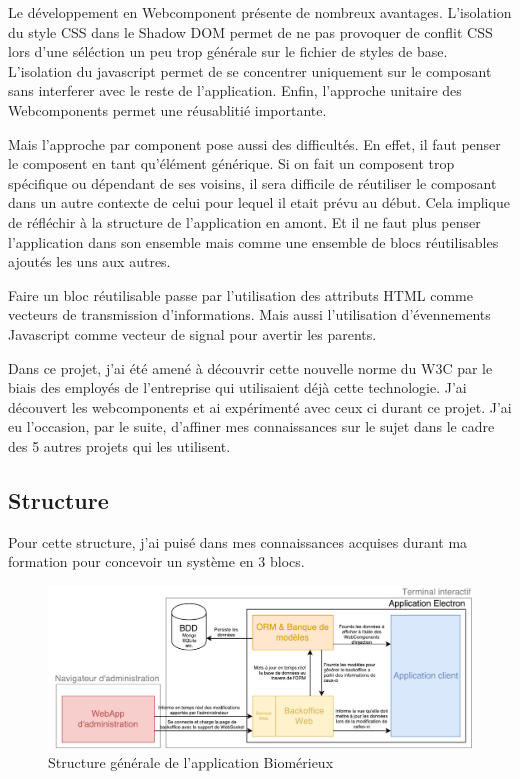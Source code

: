 \bigskip

Le développement en Webcomponent présente de nombreux avantages.
L'isolation du style CSS dans le Shadow DOM permet de ne pas provoquer de conflit CSS lors d'une séléction un peu trop générale sur le fichier de styles de base.
L'isolation du javascript permet de se concentrer uniquement sur le composant sans interferer avec le reste de l'application.
Enfin, l'approche unitaire des Webcomponents permet une réusablitié importante.

Mais l'approche par component pose aussi des difficultés.
En effet, il faut penser le composent en tant qu'élément générique.
Si on fait un composent trop spécifique ou dépendant de ses voisins, il sera difficile de réutiliser le composant dans un autre contexte de celui pour lequel il etait prévu au début.
Cela implique de réfléchir à la structure de l'application en amont.
Et il ne faut plus penser l'application dans son ensemble mais comme une ensemble de blocs réutilisables ajoutés les uns aux autres.

Faire un bloc réutilisable passe par l'utilisation des attributs HTML comme vecteurs de transmission d'informations.
Mais aussi l'utilisation d'évennements Javascript comme vecteur de signal pour avertir les parents.

\bigskip

Dans ce projet, j'ai été amené à découvrir cette nouvelle norme du W3C par le biais des employés de l'entreprise qui utilisaient déjà cette technologie.
J'ai découvert les webcomponents et ai expérimenté avec ceux ci durant ce projet.
J'ai eu l'occasion, par le suite, d'affiner mes connaissances sur le sujet dans le cadre des 5 autres projets qui les utilisent.

\subsection{Structure}

Pour cette structure, j'ai puisé dans mes connaissances acquises durant ma formation pour concevoir un système en 3 blocs.

\begin{figure}[h]
    \centering
    \includegraphics[scale=0.6]{img/Proposition-utopia.pdf}
    \caption{Structure générale de l'application Biomérieux}
\end{figure}

